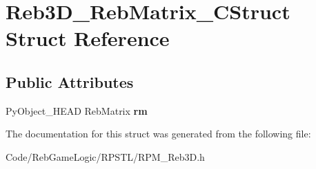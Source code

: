 \hypertarget{struct_reb3_d___reb_matrix___c_struct}{}\section{Reb3\+D\+\_\+\+Reb\+Matrix\+\_\+\+C\+Struct Struct Reference}
\label{struct_reb3_d___reb_matrix___c_struct}
\subsection*{Public Attributes}
\begin{DoxyCompactItemize}
\item 
Py\+Object\+\_\+\+H\+E\+AD Reb\+Matrix {\bfseries rm}\hypertarget{struct_reb3_d___reb_matrix___c_struct_a9607b320d258f3d1e388c139f0be3833}{}\label{struct_reb3_d___reb_matrix___c_struct_a9607b320d258f3d1e388c139f0be3833}

\end{DoxyCompactItemize}


The documentation for this struct was generated from the following file\+:\begin{DoxyCompactItemize}
\item 
Code/\+Reb\+Game\+Logic/\+R\+P\+S\+T\+L/R\+P\+M\+\_\+\+Reb3\+D.\+h\end{DoxyCompactItemize}
